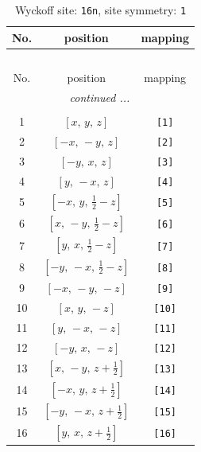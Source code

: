 \documentclass[fleqn,8pt]{jsarticle}
\begin{document}
\begin{longtable}{ccc}
\caption{Wyckoff site: {\tt 16n}, site symmetry: {\tt 1}}
 \\
 \hline \hline
No. & position & mapping \\ \hline \endfirsthead

\multicolumn{2}{l}{\tablename\ \thetable{}} \\
 \hline \hline
No. & position & mapping \\ \hline \endhead

 \hline \hline
\multicolumn{2}{r}{\footnotesize\it continued ...} \\ \endfoot

 \hline \hline
\multicolumn{2}{r}{} \\ \endlastfoot

1 & $\left[ x,\, y,\, z \right]$ & {\tt [1]} \\ \hline
2 & $\left[ - x,\, - y,\, z \right]$ & {\tt [2]} \\ \hline
3 & $\left[ - y,\, x,\, z \right]$ & {\tt [3]} \\ \hline
4 & $\left[ y,\, - x,\, z \right]$ & {\tt [4]} \\ \hline
5 & $\left[ - x,\, y,\, \frac{1}{2} - z \right]$ & {\tt [5]} \\ \hline
6 & $\left[ x,\, - y,\, \frac{1}{2} - z \right]$ & {\tt [6]} \\ \hline
7 & $\left[ y,\, x,\, \frac{1}{2} - z \right]$ & {\tt [7]} \\ \hline
8 & $\left[ - y,\, - x,\, \frac{1}{2} - z \right]$ & {\tt [8]} \\ \hline
9 & $\left[ - x,\, - y,\, - z \right]$ & {\tt [9]} \\ \hline
10 & $\left[ x,\, y,\, - z \right]$ & {\tt [10]} \\ \hline
11 & $\left[ y,\, - x,\, - z \right]$ & {\tt [11]} \\ \hline
12 & $\left[ - y,\, x,\, - z \right]$ & {\tt [12]} \\ \hline
13 & $\left[ x,\, - y,\, z + \frac{1}{2} \right]$ & {\tt [13]} \\ \hline
14 & $\left[ - x,\, y,\, z + \frac{1}{2} \right]$ & {\tt [14]} \\ \hline
15 & $\left[ - y,\, - x,\, z + \frac{1}{2} \right]$ & {\tt [15]} \\ \hline
16 & $\left[ y,\, x,\, z + \frac{1}{2} \right]$ & {\tt [16]} \\
\end{longtable}
\end{document}
